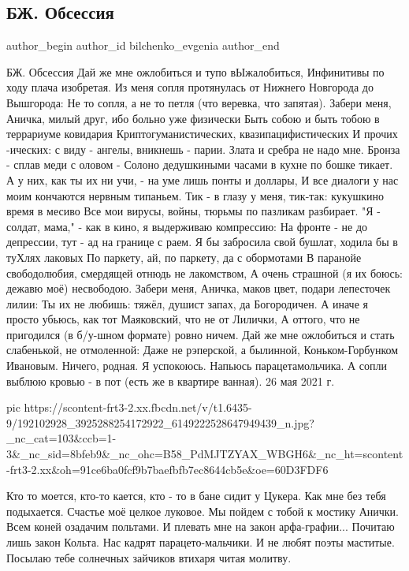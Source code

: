  
 
 
 
 
 
\subsection{БЖ. Обсессия}
\label{sec:26_05_2021.fb.bilchenko_evgenia.1.obsessia}
\ifcmt
 author_begin
   author_id bilchenko_evgenia
 author_end
\fi

БЖ. Обсессия
Дай же мне ожлобиться и тупо вЫжалобиться,
Инфинитивы по ходу плача изобретая.
Из меня сопля протянулась от Нижнего Новгорода до Вышгорода:
Не то сопля, а не то петля (что веревка, что запятая).
Забери меня, Аничка, милый друг, ибо больно уже физически
Быть собою и быть тобою в террариуме ковидария
Криптогуманистических, квазипацифистических
И прочих -ических: с виду - ангелы, вникнешь - парии.
Злата и сребра не надо мне. Бронза - сплав меди с оловом -
Солоно дедушкиными часами в кухне по бошке тикает.
А у них, как ты их ни учи, - на уме лишь понты и доллары,
И все диалоги у нас моим кончаются нервным типаньем.
Тик - в глазу у меня, тик-так: кукушкино время в месиво
Все мои вирусы, войны, тюрьмы по пазликам разбирает.
"Я - солдат, мама," - как в кино, я выдерживаю компрессию:
На фронте - не до депрессии, тут - ад на границе с раем.
Я бы забросила свой бушлат, ходила бы в туХлях лаковых
По паркету, ай, по паркету, да с обормотами
В паранойе свободолюбия, смердящей отнюдь не лакомством,
А очень страшной (я их боюсь: дежавю моё) несвободою.
Забери меня, Аничка, маков цвет, подари лепесточек лилии:
Ты их не любишь: тяжёл, душист запах, да Богородичен.
А иначе я просто убьюсь, как тот Маяковский, что не от Лилички,
А оттого, что не пригодился (в б/у-шном формате) ровно ничем.
Дай же мне ожлобиться и стать слабенькой, не отмоленной:
Даже не рэперской, а былинной, Коньком-Горбунком Ивановым.
Ничего, родная. Я успокоюсь. Напьюсь парацетамольчика.
А сопли выблюю кровью - в пот (есть же в квартире ванная).
26 мая 2021 г.


\ifcmt
  pic https://scontent-frt3-2.xx.fbcdn.net/v/t1.6435-9/192102928_3925288254172922_6149222528647949439_n.jpg?_nc_cat=103&ccb=1-3&_nc_sid=8bfeb9&_nc_ohc=B58_PdMJTZYAX_WBGH6&_nc_ht=scontent-frt3-2.xx&oh=91ce6ba0fcf9b7baefbfb7ec8644cb5e&oe=60D3FDF6
\fi

\begin{itemize}

Кто то моется, кто-то кается, кто - то в бане сидит у Цукера. Как мне без тебя
подыхается. Счастье моё целкое луковое. Мы пойдем с тобой к мостику Анички.
Всем коней озадачим польтами. И плевать мне на закон арфа-графии... Почитаю
лишь закон Кольта. Нас кадрят парацето-мальчики. И не любят поэты маститые.
Посылаю тебе солнечных зайчиков втихаря читая молитву.
\end{itemize}
